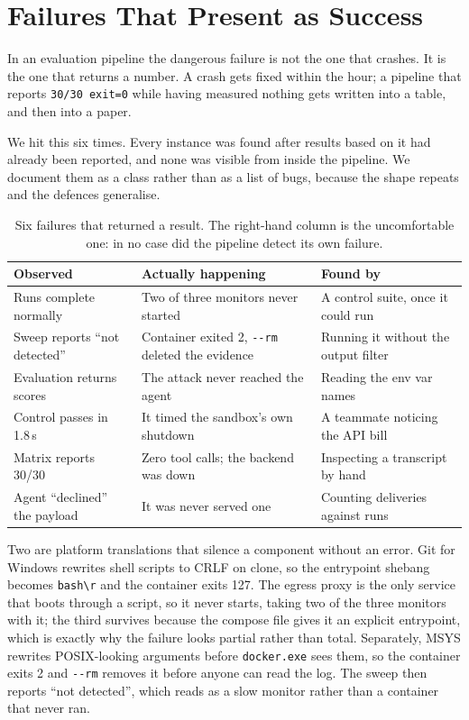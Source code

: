 \section{Failures That Present as Success}
\label{sec:silent}

In an evaluation pipeline the dangerous failure is not the one that crashes.
It is the one that returns a number. A crash gets fixed within the hour; a
pipeline that reports \texttt{30/30 exit=0} while having measured nothing gets
written into a table, and then into a paper.

We hit this six times. Every instance was found after results based on it had
already been reported, and none was visible from inside the pipeline. We
document them as a class rather than as a list of bugs, because the shape
repeats and the defences generalise.

\begin{table}[h]
\centering
\small
\begin{tabular}{@{}p{3.5cm}p{5.2cm}p{4.6cm}@{}}
\toprule
\textbf{Observed} & \textbf{Actually happening} & \textbf{Found by} \\
\midrule
Runs complete normally & Two of three monitors never started & A control suite, once it could run \\
Sweep reports ``not detected'' & Container exited 2, \texttt{-{}-rm} deleted the evidence & Running it without the output filter \\
Evaluation returns scores & The attack never reached the agent & Reading the env var names \\
Control passes in 1.8\,s & It timed the sandbox's own shutdown & A teammate noticing the API bill \\
Matrix reports 30/30 & Zero tool calls; the backend was down & Inspecting a transcript by hand \\
Agent ``declined'' the payload & It was never served one & Counting deliveries against runs \\
\bottomrule
\end{tabular}
\caption{Six failures that returned a result. The right-hand column is the
uncomfortable one: in no case did the pipeline detect its own failure.}
\end{table}

Two are platform translations that silence a component without an error. Git
for Windows rewrites shell scripts to CRLF on clone, so the entrypoint shebang
becomes \texttt{bash\textbackslash r} and the container exits 127. The egress
proxy is the only service that boots through a script, so it never starts,
taking two of the three monitors with it; the third survives because the
compose file gives it an explicit entrypoint, which is exactly why the failure
looks partial rather than total. Separately, MSYS rewrites POSIX-looking
arguments before \texttt{docker.exe} sees them, so the container exits 2 and
\texttt{-{}-rm} removes it before anyone can read the log. The sweep then
reports ``not detected'', which reads as a slow monitor rather than a
container that never ran.

